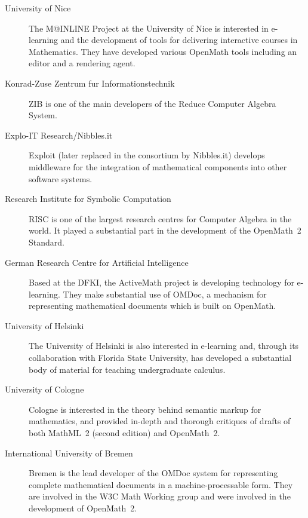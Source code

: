 \begin{description}
\item[University of Nice]  The M@INLINE Project at the University of
Nice is interested in e-learning and the development of tools for
delivering interactive courses in Mathematics.  They have developed
various OpenMath tools including an editor and a rendering agent.

\item[Konrad-Zuse Zentrum fur Informationstechnik] ZIB is one of the
main developers of the Reduce Computer Algebra System.

\item[Explo-IT Research/Nibbles.it] Exploit (later replaced in the
consortium by Nibbles.it) develops middleware for
the integration of mathematical components into other software systems.

\item[Research Institute for Symbolic Computation] RISC is one of the
largest research centres for Computer Algebra in the world.  It played a
substantial part in the development of the OpenMath~2 Standard.

\item[German Research Centre for Artificial Intelligence]  Based at the
DFKI, the ActiveMath project is developing technology for e-learning.  They
make substantial use of OMDoc, a mechanism for representing mathematical
documents which is built on OpenMath.

\item[University of Helsinki]  The University of Helsinki is also
interested in e-learning and, through its collaboration with Florida
State University, has developed a substantial body of material for
teaching undergraduate calculus.

\item[University of Cologne]  Cologne is interested in the theory behind
semantic markup for mathematics, and provided in-depth and thorough
critiques of drafts of both MathML~2 (second edition) and OpenMath~2.

\item[International University of Bremen] Bremen is the lead developer
of the OMDoc system for representing complete mathematical documents in
a machine-processable form.  They are involved in the W3C Math Working
group and were involved in the development of OpenMath~2.

\end{description}
